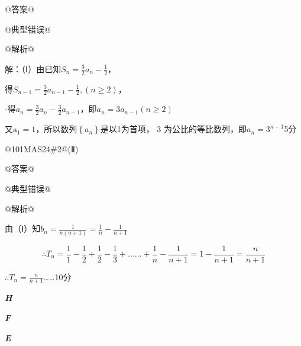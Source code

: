 \documentclass{scrbook}
\begin{document}
@答案@

@典型错误@

@解析@

解：（Ⅰ）由已知$S_{n}=\frac{3}{2}a_{n}- \frac{1}{2}$，

得$S_{n- 1}=\frac{3}{2}a_{n- 1}- \frac{1}{2},(n\geq 2)$，

-得$a_{n}=\frac{3}{2}a_{n}- \frac{3}{2}a_{n- 1}$，即$a_{n}=3a_{n- 1}(n\geq 2)$

又$\mathrm{a}_{1}=1$，所以数列$\left\{a_{n}\right\}$是以1为首项， 3 为公比的等比数列，即$a_{n}=3^{n- 1}$\raisebox{-6pt}{，}{\ldots}{\ldots}5分

@101MA{\textbar}S24\#2@(Ⅱ)

@答案@

@典型错误@

@解析@

 由（Ⅰ）知$b_{n}=\frac{1}{n(n+1)}=\frac{1}{n}- \frac{1}{n+1}$

\begin{equation*}
\therefore T_{n}=\frac{1}{1}- \frac{1}{2}+\frac{1}{2}- \frac{1}{3}+......+\frac{1}{n}- \frac{1}{n+1}=1- \frac{1}{n+1}=\frac{n}{n+1}
\end{equation*}

$\therefore T_{n}=\frac{n}{n+1}${\ldots}{\ldots}10分

\textbf{\textit{H}}

\textbf{\textit{F}}

\textbf{\textit{E}}
\end{document}

